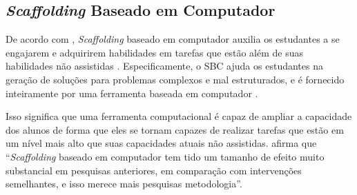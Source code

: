 \subsection{\textit{Scaffolding} Baseado em Computador}

De acordo com , \textit{Scaffolding} baseado em computador auxilia os estudantes a se engajarem e adquirirem habilidades em tarefas que estão além de suas habilidades não assistidas \cite{Hannafin1999,Quintana2004,Belland2014}. Especificamente, o SBC ajuda os estudantes na geração de soluções para problemas complexos e mal estruturados, e é fornecido inteiramente por uma ferramenta baseada em computador \cite{Belland2017}.

Isso significa que uma ferramenta computacional é capaz de ampliar a capacidade dos alunos de forma que eles se tornam capazes de realizar tarefas que estão em um nível mais alto que suas capacidades atuais não assistidas.  afirma que “\textit{Scaffolding} baseado em computador tem tido um tamanho de efeito muito substancial em pesquisas anteriores, em comparação com intervenções semelhantes, e isso merece mais pesquisas metodologia”. 